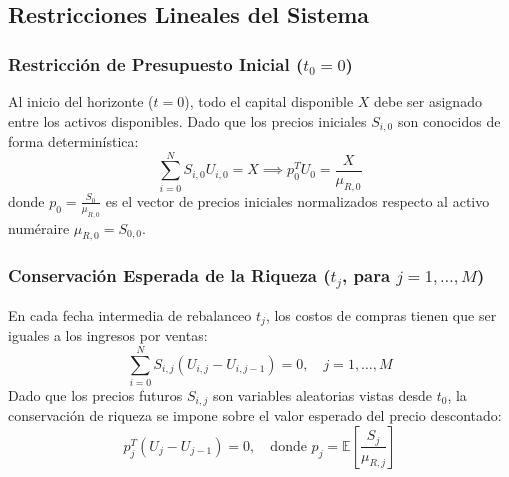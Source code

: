 \documentclass[11pt,a4paper]{article}
\begin{document}
\subsection{Restricciones Lineales del Sistema}

\subsubsection{Restricción de Presupuesto Inicial \texorpdfstring{($t_0 = 0$)}{(t0 = 0)}}
Al inicio del horizonte ($t = 0$), todo el capital disponible $X$ debe ser asignado entre los activos disponibles. Dado que los precios iniciales $S_{i,0}$ son conocidos de forma determinística:
\begin{equation}
    \sum_{i=0}^N S_{i,0} U_{i,0} = X \implies p_0^T U_0 = \frac{X}{\mu_{R,0}}
\end{equation}
donde $p_0 = \frac{S_0}{\mu_{R,0}}$ es el vector de precios iniciales normalizados respecto al activo numéraire $\mu_{R,0} = S_{0,0}$.

\subsubsection{Conservación Esperada de la Riqueza \texorpdfstring{($t_j$, para $j = 1, \dots, M$)}{(tj, j = 1...M)}}
En cada fecha intermedia de rebalanceo $t_j$, los costos de compras tienen que ser iguales a los ingresos por ventas:
\begin{equation}
    \sum_{i=0}^N S_{i,j} (U_{i,j} - U_{i,j-1}) = 0, \quad j = 1, \dots, M
\end{equation}
Dado que los precios futuros $S_{i,j}$ son variables aleatorias vistas desde $t_0$, la conservación de riqueza se impone sobre el valor esperado del precio descontado:
\begin{equation}
    p_j^T (U_j - U_{j-1}) = 0, \quad \text{donde } p_j = \mathbb{E}\left[ \frac{S_j}{\mu_{R,j}} \right]
\end{equation}
\end{document}
